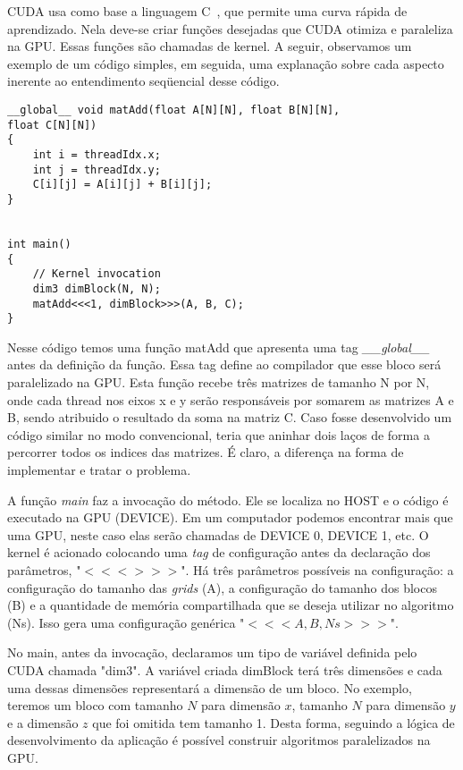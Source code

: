CUDA usa como base a linguagem C~\citep{cuda}, que permite uma curva rápida de aprendizado. Nela deve-se criar funções desejadas que CUDA otimiza e paraleliza na GPU. Essas funções são chamadas de kernel. A seguir, observamos um exemplo de um código simples, em seguida, uma explanação sobre cada aspecto inerente ao entendimento seqüencial desse código.


\begin{verbatim}
__global__ void matAdd(float A[N][N], float B[N][N],
float C[N][N])
{
    int i = threadIdx.x;
    int j = threadIdx.y;
    C[i][j] = A[i][j] + B[i][j];
}


int main()
{
    // Kernel invocation
    dim3 dimBlock(N, N);
    matAdd<<<1, dimBlock>>>(A, B, C);
}

\end{verbatim}

Nesse código temos uma função matAdd que apresenta uma tag \textit{\_\_global\_\_} antes da definição da função. Essa tag define ao compilador que esse bloco será paralelizado na GPU.  Esta função recebe três matrizes de tamanho N por N, onde cada thread nos eixos x e y serão responsáveis por somarem as matrizes A e B, sendo atribuido o resultado da soma na matriz C.  Caso fosse desenvolvido um código similar no modo convencional, teria que aninhar dois laços de forma a percorrer todos os indices das matrizes. É claro, a diferença na forma de implementar e tratar o problema.

A função \textit{main} faz a invocação do método. Ele se localiza no HOST e o código é executado na GPU (DEVICE). Em um computador podemos encontrar mais que uma GPU, neste caso elas serão chamadas de DEVICE 0, DEVICE 1, etc. O kernel é acionado colocando uma \textit{tag} de configuração antes da declaração dos parâmetros, "$<<< >>>$". Há três parâmetros possíveis na configuração: a configuração do tamanho das \textit{grids} (A), a configuração do tamanho dos blocos (B) e a quantidade de memória compartilhada que se deseja utilizar no algoritmo (Ns). Isso gera uma configuração genérica "$<<<A,B,Ns >>>$".

No main, antes da invocação, declaramos um tipo de variável definida pelo CUDA chamada "dim3". A variável criada dimBlock terá três dimensões e cada uma dessas dimensões representará a dimensão de um bloco. No exemplo, teremos um bloco com tamanho $N$ para dimensão $x$, tamanho $N$ para dimensão $y$ e a dimensão $z$ que foi omitida tem tamanho 1. Desta forma, seguindo a lógica de desenvolvimento da aplicação é possível construir algoritmos paralelizados na GPU.


